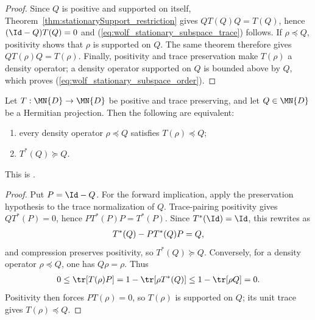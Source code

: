 \begin{proof}
    \leanok
    Since $Q$ is positive and supported on itself,
    Theorem~\ref{thm:stationarySupport_restriction} gives
    $QT(Q)Q=T(Q)$, hence $(\Id-Q)T(Q)=0$ and
    (\ref{eq:wolf_stationary_subspace_trace}) follows. If
    $\rho\preceq Q$, positivity shows that $\rho$ is supported on $Q$.
    The same theorem therefore gives $QT(\rho)Q=T(\rho)$. Finally,
    positivity and trace preservation make $T(\rho)$ a density operator;
    a density operator supported on $Q$ is bounded above by $Q$, which proves
    (\ref{eq:wolf_stationary_subspace_order}).
\end{proof}

\begin{theorem}%
    \label{thm:wolf_stationary_subspaces_ii}
    \leanok
    Let $T:\MN{D}\to\MN{D}$ be positive and trace preserving, and let
    $Q\in\MN{D}$ be a Hermitian projection. Then the following are
    equivalent:
    \begin{enumerate}
        \item every density operator $\rho\preceq Q$ satisfies
              $T(\rho)\preceq Q$;
        \item $T^*(Q)\succeq Q$.
    \end{enumerate}
    This is \cite[Proposition~6.11]{Wolf2012Quantum}.
\end{theorem}

\begin{proof}
    \leanok
    Put $P=\Id-Q$. For the forward implication, apply the preservation
    hypothesis to the trace normalization of $Q$. Trace-pairing positivity
    gives $QT^*(P)=0$, hence
    $PT^*(P)P=T^*(P)$. Since $T^*(\Id)=\Id$, this rewrites as
    \begin{align}
        T^*(Q)-PT^*(Q)P=Q,
        \notag
    \end{align}
    and compression preserves positivity, so $T^*(Q)\succeq Q$.
    Conversely, for a density operator $\rho\preceq Q$, one has
    $Q\rho=\rho$. Thus
    \begin{align}
        0
        \leq \tr[T(\rho)P]
        =1-\tr[\rho T^*(Q)]
        \leq1-\tr[\rho Q]
        =0.
        \notag
    \end{align}
    Positivity then forces $PT(\rho)=0$, so $T(\rho)$ is supported on $Q$;
    its unit trace gives $T(\rho)\preceq Q$.
\end{proof}


